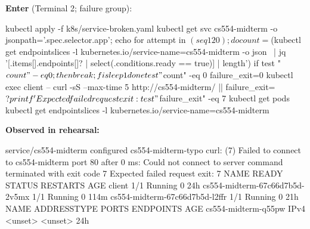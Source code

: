 \documentclass[11pt,letterpaper]{article}
\newcommand{\enter}[1]{\par\noindent\textbf{Enter} (#1):\par}
\newcommand{\observed}{\par\noindent\textbf{Observed in rehearsal:}\par}
\begin{document}
\enter{Terminal 2; failure group}
\begin{cmd}
kubectl apply -f k8s/service-broken.yaml
kubectl get svc cs554-midterm -o jsonpath='{.spec.selector.app}'; echo
for attempt in $(seq 1 20); do
    count=$(kubectl get endpointslices -l kubernetes.io/service-name=cs554-midterm -o json \
      | jq '[.items[].endpoints[]? | select(.conditions.ready == true)] | length')
    if test "$count" -eq 0; then break; fi
    sleep 1
done
test "$count" -eq 0
failure_exit=0
kubectl exec client -- curl -sS --max-time 5 http://cs554-midterm/ || failure_exit=$?
printf 'Expected failed request exit: %
test "$failure_exit" -eq 7
kubectl get pods
kubectl get endpointslices -l kubernetes.io/service-name=cs554-midterm
\end{cmd}
\observed
\begin{out}
service/cs554-midterm configured
cs554-midterm-typo
curl: (7) Failed to connect to cs554-midterm port 80 after 0 ms: Could not connect to server
command terminated with exit code 7
Expected failed request exit: 7
NAME                             READY   STATUS    RESTARTS   AGE
client                           1/1     Running   0          24h
cs554-midterm-67c66d7b5d-2v5mx   1/1     Running   0          114m
cs554-midterm-67c66d7b5d-l2ffr   1/1     Running   0          21h
NAME                  ADDRESSTYPE   PORTS     ENDPOINTS   AGE
cs554-midterm-q55pw   IPv4          <unset>   <unset>     24h
\end{out}
\end{document}

